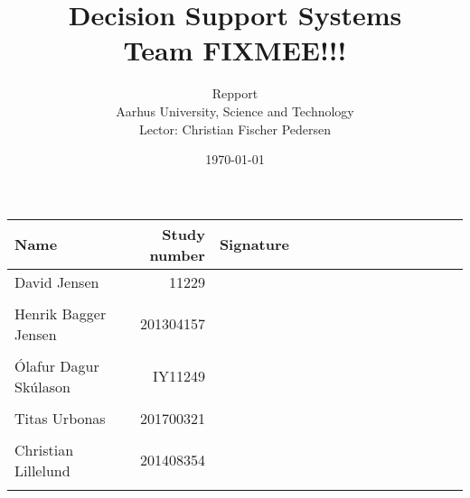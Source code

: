 \documentclass[a4paper,11pt,twoside,openright]{memoir}
\title{Decision Support Systems \\ Team FIXMEE!!!}
\author{Repport \\ Aarhus University, Science and Technology \\ Lector: Christian Fischer Pedersen}
\date{\today}
\begin{document}
\fancyhf{} %
\frontmatter
\maketitle
\vfill


\begin{table} [h]
	\centering
	\begin{tabular}{|l|r|l|}
	\hline 
	\textbf{Name} 				& \textbf{Study number} & \textbf{Signature~~~~~~~~~~~~~~~~~~~~} 	\\ \hline
	David Jensen 				& 11229 	& \\ && 												\\ \hline
	Henrik Bagger Jensen 		& 201304157 & \\ && 												\\ \hline
	Ólafur Dagur Skúlason 		& IY11249	& \\ && 												\\ \hline
	Titas Urbonas 				& 201700321 & \\ && 												\\ \hline
	Christian Lillelund 		& 201408354 & \\ && 												\\ \hline

	\end{tabular}
\end{table}

\clearpage
\pagestyle{plain}

\tableofcontents

\vfill

\mainmatter
\pagestyle{fancy}
\fancyhf{} %
\fancyhead[CE,CO]{\nouppercase{\leftmark}}
\fancyfoot[CO,CE]{\nouppercase{\rightmark}}
\fancyfoot[LE,RO]{\thepage}

				    \cleartorightpage
	\cleartorightpage
	\cleartorightpage
				        \cleartorightpage
				        \cleartorightpage
				    \cleartorightpage
					    \cleartorightpage

\end{document}
